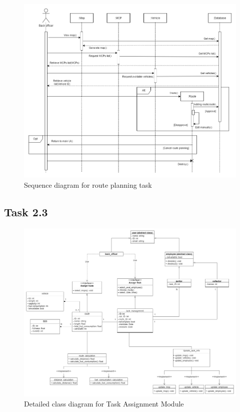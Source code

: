 \documentclass[a4paper]{article}
\begin{document}
\hypertarget{sequence}{
\begin{figure}
\centering
  \includegraphics[width=1\linewidth]{SequenceDiagram.png}
  \caption{Sequence diagram for route planning task}
\end{figure}}

\subsection{Task 2.3}
\hypertarget{class}{
\begin{figure}
\hspace{-3cm}
  \includegraphics[width=1.4\linewidth]{classdiagram.drawio.png}
  \caption{Detailed class diagram for Task Assignment Module}
\end{figure}}
\end{document}
